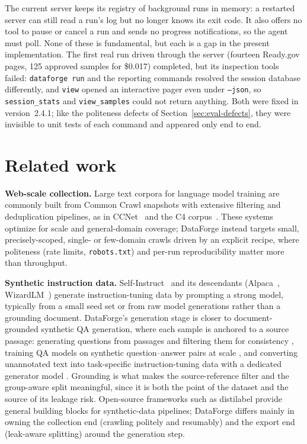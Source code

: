 \documentclass[11pt]{article}
\begin{document}
The current server keeps its registry of background runs in memory: a
restarted server can still read a run's log but no longer knows its exit
code. It also offers no tool to pause or cancel a run and sends no
progress notifications, so the agent must poll. None of these is
fundamental, but each is a gap in the present implementation. The first
real run driven through the server (fourteen Ready.gov pages, 125 approved
samples for \$0.017) completed, but its inspection tools failed:
\texttt{dataforge run} and the reporting commands resolved the session
database differently, and \texttt{view} opened an interactive pager even
under \texttt{--json}, so \texttt{session\_stats} and \texttt{view\_samples}
could not return anything. Both were fixed in version~2.4.1; like the
politeness defects of Section~\ref{sec:eval-defects}, they were invisible to
unit tests of each command and appeared only end to end.

\section{Related work}

\textbf{Web-scale collection.} Large text corpora for language model
training are commonly built from Common Crawl snapshots with extensive
filtering and deduplication pipelines, as in
CCNet~\cite{wenzek2020ccnet} and the C4 corpus~\cite{raffel2020exploring}.
These systems optimize for scale and general-domain coverage; DataForge
instead targets small, precisely-scoped, single- or few-domain crawls
driven by an explicit recipe, where politeness (rate limits,
\texttt{robots.txt}) and per-run reproducibility matter more than
throughput.

\textbf{Synthetic instruction data.} Self-Instruct~\cite{wang2023selfinstruct}
and its descendants (Alpaca~\cite{taori2023alpaca},
WizardLM~\cite{xu2023wizardlm}) generate instruction-tuning data by
prompting a strong model, typically from a small seed set or from raw
model generations rather than a grounding document. DataForge's
generation stage is closer to document-grounded synthetic QA generation,
where each sample is anchored to a source passage: generating questions
from passages and filtering them for consistency
\cite{alberti2019synthetic}, training QA models on synthetic question--answer
pairs at scale \cite{puri2020training}, and converting unannotated text
into task-specific instruction-tuning data with a dedicated generator
model \cite{nayak2024bonito}. Grounding is what makes the source-reference
filter and the group-aware split meaningful, since it is both the point of
the dataset and the source of its leakage risk. Open-source frameworks
such as distilabel \cite{distilabel} provide general building blocks for
synthetic-data pipelines; DataForge differs mainly in owning the
collection end (crawling politely and resumably) and the export end
(leak-aware splitting) around the generation step.
\end{document}
